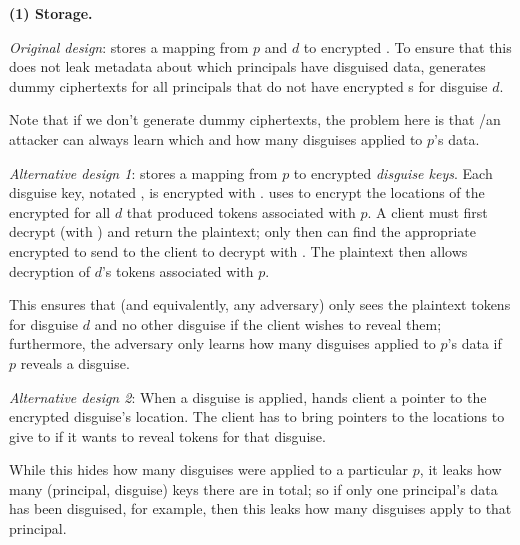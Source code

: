 \vspace{6pt}\noindent\textbf{(1) \symk{} Storage.}

\emph{Original design}: \sys stores a mapping from $p$ and $d$ to encrypted .
To ensure that this does not leak metadata about which principals have disguised data, \sys generates dummy ciphertexts for all
principals that do not have encrypted s for disguise $d$.

Note that if we don't generate dummy ciphertexts, the problem here is that \sys/an attacker can always
learn which and how many disguises applied to $p$'s data.

\vspace{12pt}
\emph{Alternative design 1}:
\sys stores a mapping from $p$ to encrypted \emph{disguise keys}. 
%
Each disguise key, notated , is encrypted with . 
\sys uses  to encrypt the locations of the encrypted  for all $d$ that produced
tokens associated with $p$.
A client must first decrypt (with ) and return the  plaintext; only then can \sys find the appropriate
encrypted  to send to the client to decrypt with . The plaintext  then allows decryption of
$d$'s tokens associated with $p$.

This ensures that \sys (and equivalently, any adversary) only sees the plaintext tokens for disguise
$d$ and no other disguise if the client wishes to reveal them; 
furthermore, the adversary only learns how many disguises applied to $p$'s data if $p$ reveals a
disguise.


\vspace{12pt}
\emph{Alternative design 2}: When a disguise is applied, \sys hands client a pointer to the
encrypted disguise's  location. The client has to bring pointers to the locations to give
to \sys if it wants to reveal tokens for that disguise.  

While this hides how many disguises were
applied to a particular $p$, it leaks how many (principal, disguise) keys there are in total; so if
only one principal's data has been disguised, for example, then this leaks how many disguises apply
to that principal.


